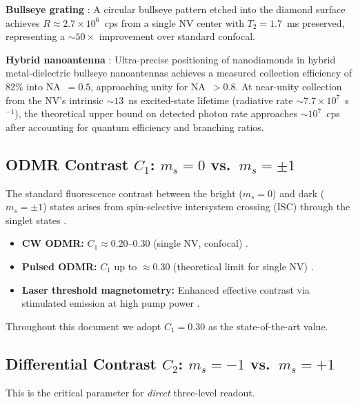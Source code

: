 \documentclass[11pt,letterpaper]{article}
\begin{document}
\noindent
\textbf{Bullseye grating} \cite{Li2015}: A circular bullseye pattern etched into
the diamond surface achieves $R \approx 2.7 \times 10^6$~cps from a single NV
center with $T_2 = 1.7$~ms preserved, representing a $\sim 50\times$
improvement over standard confocal.

\textbf{Hybrid nanoantenna} \cite{Barbiero2025}: Ultra-precise positioning of
nanodiamonds in hybrid metal-dielectric bullseye nanoantennas achieves a
measured collection efficiency of 82\% into NA~$= 0.5$, approaching unity for
NA~$> 0.8$.  At near-unity collection from the NV's intrinsic $\sim 13$~ns
excited-state lifetime (radiative rate $\sim 7.7 \times 10^7$~s$^{-1}$), the
theoretical upper bound on detected photon rate approaches $\sim 10^7$~cps
after accounting for quantum efficiency and branching ratios.


\subsection{ODMR Contrast $C_1$: $m_s = 0$ vs.\ $m_s = \pm 1$}

The standard fluorescence contrast between the bright ($m_s = 0$) and dark
($m_s = \pm 1$) states arises from spin-selective intersystem crossing (ISC)
through the singlet states \cite{Doherty2013}.

\begin{itemize}
  \item \textbf{CW ODMR:} $C_1 \approx 0.20$--$0.30$ (single NV, confocal)
    \cite{Doherty2013, Barry2020}. %
  \item \textbf{Pulsed ODMR:} $C_1$ up to $\approx 0.30$ (theoretical limit
    for single NV) \cite{Barry2020}. %
  \item \textbf{Laser threshold magnetometry:} Enhanced effective contrast via
    stimulated emission at high pump power \cite{Doherty2013}. %
\end{itemize}

\noindent
Throughout this document we adopt $C_1 = 0.30$ as the state-of-the-art value. %


\subsection{Differential Contrast $C_2$: $m_s = -1$ vs.\ $m_s = +1$}
\label{sec:C2}

This is the critical parameter for \emph{direct} three-level readout.
\end{document}
